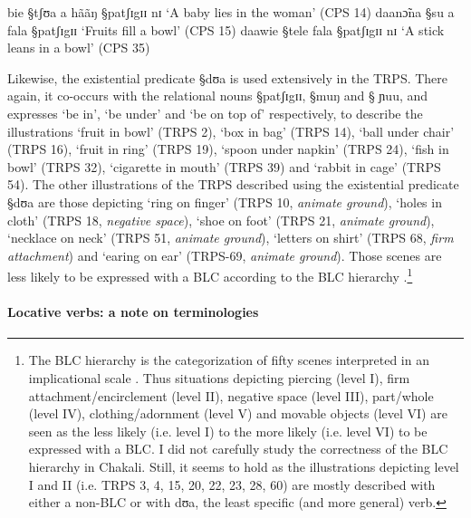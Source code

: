 \begin{exe}
\ex\label{ex:SPA-cont-pos-ver}
\begin{xlist}
\ex\label{ex:SPA-cont-pos-ver-CPS-14}
bie {\S tʃʊa} a hããŋ {\S patʃɪgɪɪ} nɪ  `A baby lies in the woman' (CPS 14)
\ex\label{ex:SPA-cont-pos-ver-CPS-15}
daanɔ̃na  {\S su} a fala {\S patʃɪgɪɪ}  `Fruits fill a bowl'  (CPS 15)
\ex\label{ex:SPA-cont-pos-ver-CPS-35}
daawie {\S tele} fala {\S patʃɪgɪɪ} nɪ   `A stick leans in a bowl' (CPS 35)
\end{xlist}
\end{exe}

Likewise,  the existential predicate {\S dʊa} is  used extensively in the TRPS.
There again,  it co-occurs with the relational nouns  {\S patʃɪgɪɪ}, {\S muŋ}
and {\S
ɲuu}, and expresses
`be in', `be under' and `be on top of' respectively,  to describe the
illustrations `fruit in bowl' (TRPS 2),  `box in bag' (TRPS 14),  `ball under
chair' (TRPS 16), `fruit in ring' (TRPS 19),  `spoon under napkin' (TRPS 24), 
`fish in bowl' (TRPS 32), `cigarette in mouth' (TRPS 39) and `rabbit in cage'
(TRPS 54). The other illustrations of
the TRPS described using the existential predicate {\S dʊa} are those depicting 
`ring on finger' (TRPS 10, {\it animate ground}), `holes in cloth' (TRPS 18,
{\it negative space}), `shoe on foot' (TRPS 21,  {\it animate ground}),
`necklace on neck' (TRPS 51, {\it animate ground}), `letters on shirt' (TRPS 68,
{\it firm attachment}) and `earing on ear' (TRPS-69,  {\it animate ground}).
Those scenes are  less  likely to be expressed with a BLC according to the BLC
hierarchy \citep[15-17, 514-519]{Levi06}.\footnote{The BLC hierarchy is the 
categorization of  fifty scenes interpreted in an implicational scale
\citep[514-519]{Levi06}. Thus situations depicting piercing (level I), firm
attachment/encirclement (level II), negative space (level III), part/whole
(level IV), clothing/adornment (level V) and movable objects (level VI) are seen
as the less likely  (i.e. level I)  to the more likely (i.e. level VI) to be
expressed with a BLC. I did not carefully study  the correctness of the BLC
hierarchy in Chakali. Still, it seems to hold   as the  illustrations depicting
level I and II (i.e. TRPS 3, 4, 15, 20, 22, 23, 28, 60) are mostly described
with either a non-BLC or with {\F dʊa}, the least specific (and more general)
verb.}


\paragraph{Locative verbs: a note on terminologies}
\label{sec:SPA-posi-post-v}


